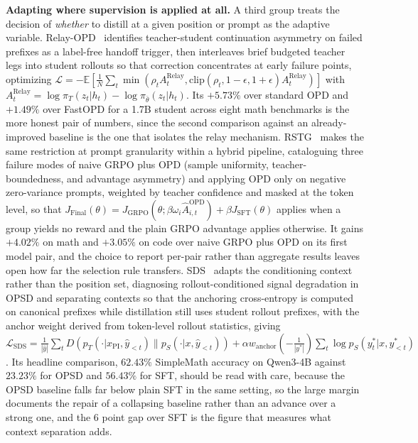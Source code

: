 \documentclass{article} %
\newcommand{\E}{\mathbb{E}}
\newcommand{\loss}{\mathcal{L}}
\begin{document}
\textbf{Adapting where supervision is applied at all.} A third group treats the decision of \emph{whether} to distill at a given position or prompt as the adaptive variable. Relay-OPD~\citep{2607.26057} identifies teacher-student continuation asymmetry on failed prefixes as a label-free handoff trigger, then interleaves brief budgeted teacher legs into student rollouts so that correction concentrates at early failure points, optimizing $\loss = -\E[\frac{1}{N}\sum_t \min(\rho_t A^{\mathrm{Relay}}_t, \mathrm{clip}(\rho_t, 1-\epsilon, 1+\epsilon)A^{\mathrm{Relay}}_t)]$ with $A^{\mathrm{Relay}}_t = \log \pi_T(z_t|h_t) - \log \pi_{\bar\theta}(z_t|h_t)$. Its $+5.73\%$ over standard OPD and $+1.49\%$ over FastOPD for a 1.7B student across eight math benchmarks is the more honest pair of numbers, since the second comparison against an already-improved baseline is the one that isolates the relay mechanism. RSTG~\citep{2608.00782} makes the same restriction at prompt granularity within a hybrid pipeline, cataloguing three failure modes of naive GRPO plus OPD (sample uniformity, teacher-boundedness, and advantage asymmetry) and applying OPD only on negative zero-variance prompts, weighted by teacher confidence and masked at the token level, so that $J_{\mathrm{Final}}(\theta) = J_{\mathrm{GRPO}}(\theta; \beta \omega_i \hat A^{\mathrm{OPD}}_{i,t}) + \beta J_{\mathrm{SFT}}(\theta)$ applies when a group yields no reward and the plain GRPO advantage applies otherwise. It gains $+4.02\%$ on math and $+3.05\%$ on code over naive GRPO plus OPD on its first model pair, and the choice to report per-pair rather than aggregate results leaves open how far the selection rule transfers. SDS~\citep{2608.07935} adapts the conditioning context rather than the position set, diagnosing rollout-conditioned signal degradation in OPSD and separating contexts so that the anchoring cross-entropy is computed on canonical prefixes while distillation still uses student rollout prefixes, with the anchor weight derived from token-level rollout statistics, giving $\loss_{\mathrm{SDS}} = \frac{1}{|\hat y|}\sum_t D(p_T(\cdot|x_{\mathrm{PI}}, \hat y_{<t}) \parallel p_S(\cdot|x, \hat y_{<t})) + \alpha w_{\mathrm{anchor}}(-\frac{1}{|y^*|})\sum_t \log p_S(y^*_t|x,y^*_{<t})$. Its headline comparison, $62.43\%$ SimpleMath accuracy on Qwen3-4B against $23.23\%$ for OPSD and $56.43\%$ for SFT, should be read with care, because the OPSD baseline falls far below plain SFT in the same setting, so the large margin documents the repair of a collapsing baseline rather than an advance over a strong one, and the $6$ point gap over SFT is the figure that measures what context separation adds.
\end{document}
